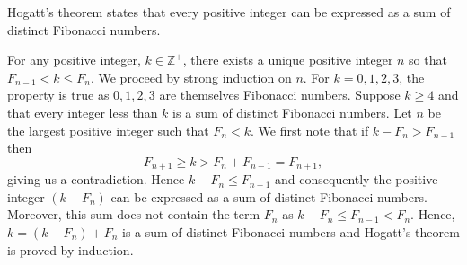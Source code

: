 \documentclass[12pt]{article}
\newcommand{\mb}{\mathbb}
\newcommand{\Z}{\mb{Z}}
\newcommand{\<}{\langle}
\renewcommand{\>}{\rangle}
\begin{document}
Hogatt's theorem states that every positive integer can be expressed as 
a sum of distinct Fibonacci numbers.

For any positive integer, $k\in\Z^+$, there exists a unique positive integer 
$n$ so that $F_{n-1} < k \leq F_n$. We proceed by strong induction on $n$.  For $k=0,1,2,3$, the property is true as $0,1,2,3$ are themselves Fibonacci numbers.  Suppose $k\geq 4$ and that every integer less than $k$ is a sum of distinct Fibonacci numbers.  Let $n$ be the largest positive integer such that $F_n<k$. We first note that if $k-F_n > F_{n-1}$ then
$$F_{n+1} \geq k > F_n + F_{n-1} = F_{n+1}, $$
giving us a contradiction.  Hence $k-F_n \leq F_{n-1}$ and consequently the positive integer $(k-F_n)$ can be expressed as a sum of distinct Fibonacci numbers.  Moreover, this sum does not contain the term $F_n$ as $k-F_n \leq F_{n-1} < F_n$.
Hence,$k = (k-F_n) + F_n$ is a sum of distinct Fibonacci numbers and Hogatt's theorem is proved by induction.
\end{document}
